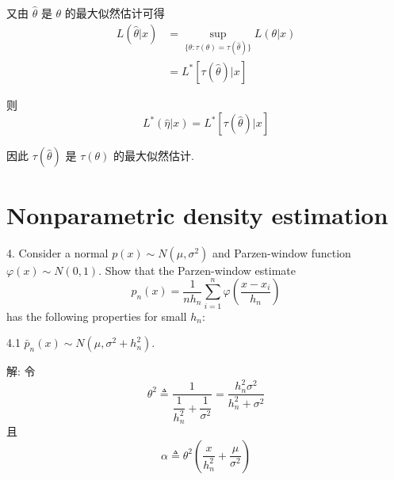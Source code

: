 \documentclass{article}
\begin{document}
又由 $\hat{\theta}$ 是 $\theta$ 的最大似然估计可得
\begin{equation}
  \begin{aligned}
    L(\hat{\theta}|x)
    &=\sup_{\{\theta:\tau(\theta)=\tau(\hat{\theta})\}}L(\theta|x)\\
    &=L^*[\tau(\hat{\theta})|x]
  \end{aligned}
\end{equation}

则
\begin{equation}
  L^*(\hat{\eta}|x)=L^*[\tau(\hat{\theta})|x]
\end{equation}

因此 $\tau(\hat{\theta})$ 是 $\tau(\theta)$ 的最大似然估计.

\section*{Nonparametric density estimation}

4. Consider a normal $p(x)\sim N(\mu,\sigma^2)$ and Parzen-window function ${\varphi(x) \sim N(0,1)}$. Show that the Parzen-window estimate
\begin{equation}
  p_{n}(x)=\frac{1}{nh_n} \sum_{i=1}^{n} \varphi\left(\frac{x-x_{i}}{h_{n}}\right)
\end{equation}
has the following properties for small $h_{n}$:

4.1 $\bar{p}_n(x)\sim N(\mu,\sigma^2+h_n^2)$.

解: 令
\begin{equation}
  \theta^2\triangleq\frac{1}{\dfrac{1}{h_n^2}+\dfrac{1}{\sigma^2}}=\frac{h_n^2\sigma^2}{h_n^2+\sigma^2}
\end{equation}
且
\begin{equation}
  \alpha\triangleq\theta^2\left(\frac{x}{h_n^2}+\frac{\mu}{\sigma^2}\right)
\end{equation}
\end{document}
